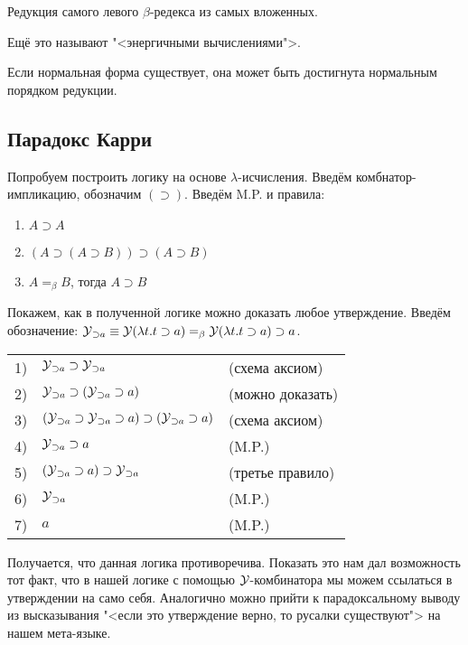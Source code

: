 \begin{definition}
    Редукция самого левого $\beta$-редекса из самых вложенных.
\end{definition}
Ещё это называют "<энергичными вычислениями">.

\begin{statement}
    Если нормальная форма существует, она может быть достигнута нормальным порядком редукции.
\end{statement}

\subsection{\texorpdfstring{Парадокс Карри}{Curry's paradox}}

Попробуем построить логику на основе $\lambda$-исчисления.
Введём комбнатор-импликацию, обозначим $(\supset)$. Введём M.P. и правила:
\begin{enumerate}
    \item $A \supset A$
    \item $(A \supset (A \supset B)) \supset (A \supset B)$
    \item $A =_{\beta} B$, тогда $A \supset B$
\end{enumerate}

Покажем, как в полученной логике можно доказать любое утверждение.
Введём обозначение: $\operatorname{\mathcal{Y}}_{\supset a} \equiv \operatorname{\mathcal{Y}} (\lambda t . t \supset a) =_{\beta} \operatorname{\mathcal{Y}} (\lambda t . t \supset a) \supset a$.

\begin{tabular}{lll}
    1) & $\operatorname{\mathcal{Y}}_{\supset a} \supset \operatorname{\mathcal{Y}}_{\supset a}$ & (схема аксиом) \\
    2) & $\operatorname{\mathcal{Y}}_{\supset a} \supset (\operatorname{\mathcal{Y}}_{\supset a} \supset a)$ & (можно доказать) \\
    3) & $(\operatorname{\mathcal{Y}}_{\supset a} \supset \operatorname{\mathcal{Y}}_{\supset a} \supset a) \supset (\operatorname{\mathcal{Y}}_{\supset a} \supset a)$ & (схема аксиом) \\
    4) & $\operatorname{\mathcal{Y}}_{\supset a} \supset a$ & (M.P.) \\
    5) & $(\operatorname{\mathcal{Y}}_{\supset a} \supset a) \supset \operatorname{\mathcal{Y}}_{\supset a}$ & (третье правило) \\
    6) & $\operatorname{\mathcal{Y}}_{\supset a}$ & (M.P.) \\
    7) & $a$ & (M.P.)
\end{tabular}

Получается, что данная логика противоречива. Показать это нам дал возможность тот факт,
что в нашей логике с помощью $\operatorname{\mathcal{Y}}$-комбинатора мы можем ссылаться в утверждении на само себя.
Аналогично можно прийти к парадоксальному выводу из высказывания "<если это утверждение верно, то русалки существуют"> на нашем мета-языке.

